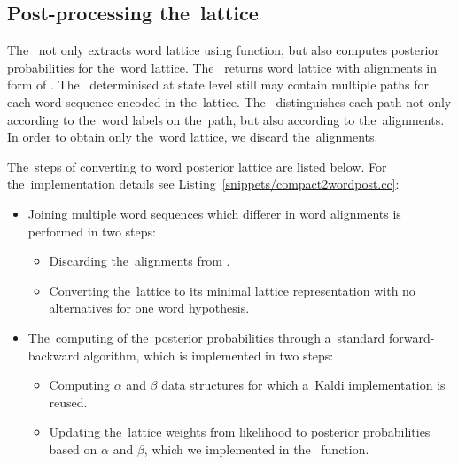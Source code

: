 \subsection{Post-processing the~lattice}
\label{sub:postprocess}
The~ not only extracts word lattice using  function, but also computes posterior probabilities for the~word lattice.
The~ returns word lattice with alignments in form of .
The~ determinised at state level still may contain multiple paths for each word sequence encoded in the~lattice.
The~ distinguishes each path not only according to the~word labels on the~path, but also according to the~alignments.
In order to obtain only the~word lattice,  we discard the~alignments. 

%

The~steps of converting  to word posterior lattice are listed below.
For the~implementation details see Listing~\ref{snippets/compact2wordpost.cc}:
\begin{itemize}
    \item Joining multiple word sequences which differer in word alignments is performed in two steps:
    \begin{itemize}
        \item Discarding the~alignments from .
        \item Converting the~lattice to its minimal lattice representation with no alternatives for one word hypothesis. 
    \end{itemize}
    \item The~computing of the~posterior probabilities through a~standard forward-backward algorithm, which is implemented in two steps:
    \begin{itemize}
        \item Computing $\alpha$ and $\beta$ data structures for which a~Kaldi implementation is reused.
        \item Updating the~lattice weights from likelihood to posterior probabilities based on $\alpha$ and $\beta$, which we implemented in the~ function.
    \end{itemize}
\end{itemize}


